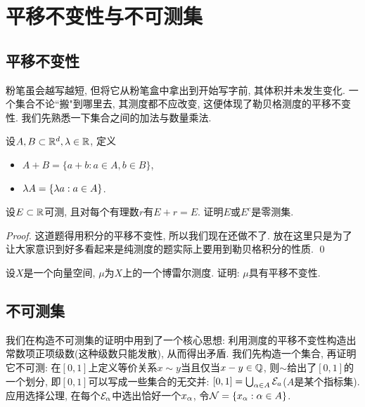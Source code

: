 \section{平移不变性与不可测集}
\subsection{平移不变性}
粉笔虽会越写越短, 但将它从粉笔盒中拿出到开始写字前, 其体积并未发生变化. 一个集合不论``搬"到哪里去, 其测度都不应改变, 这便体现了勒贝格测度的平移不变性. 
我们先熟悉一下集合之间的加法与数量乘法.
\begin{definition}
    设$A, B \subset \mathbb{R}^d, \lambda \in \mathbb{R}$, 定义
    \begin{itemize}
    \item $A+B=\{a+b: a\in A, b\in B\}$,
    \item $\lambda A = \{\lambda a: a \in A\}$.
    \end{itemize}
\end{definition}


\begin{example}
    设$E \subset \mathbb{R}$可测, 且对每个有理数$r$有$E+r=E$. 证明$E$或$E^c$是零测集.
\end{example}
\begin{proof}
    这道题得用积分的平移不变性, 所以我们现在还做不了. 放在这里只是为了让大家意识到好多看起来是纯测度的题实际上要用到勒贝格积分的性质. \qed     
\end{proof}

\begin{example}
    设$X$是一个向量空间, $\mu$为$X$上的一个博雷尔测度. 证明: $\mu$具有平移不变性. 
\end{example}



\subsection{不可测集}
我们在构造不可测集的证明中用到了一个核心思想: 利用测度的平移不变性构造出常数项正项级数(这种级数只能发散), 从而得出矛盾. 
我们先构造一个集合, 再证明它不可测:
在$[0,1]$上定义等价关系$x \sim y$当且仅当$x-y \in \mathbb{Q}$,
则$\sim$给出了$[0,1]$的一个划分, 即$[0,1]$可以写成一些集合的无交并:
$[0,1]=\bigcup_{\alpha \in A} \mathcal{E}_a$($A$是某个指标集). 应用选择公理, 在每个$\mathcal{E}_\alpha$中选出恰好一个$x_\alpha$, 令$\mathcal{N} = \{x_\alpha: \alpha \in A\}$.

